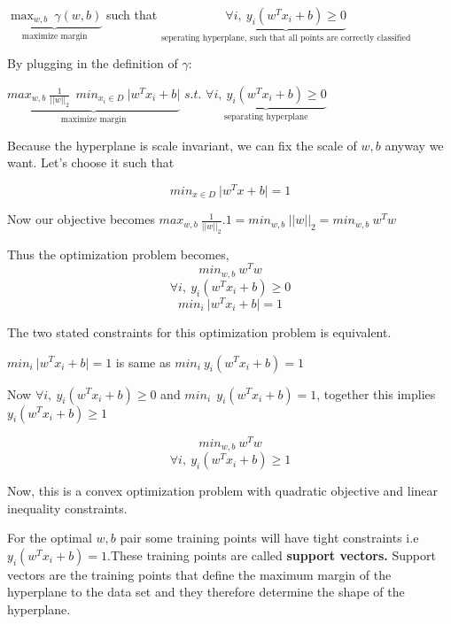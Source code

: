 \documentclass[12pt]{article}
\begin{document}
 $\underbrace{\max_{w,b}  \ \gamma(w,b)}_\text{maximize margin}$ such that $\underbrace{ \forall i, \ y_{i}(w^{T}x_{i} + b) \geq 0}_\text{seperating hyperplane, such that all points are correctly classified}$
 
 
 By plugging in the definition of $\gamma$:
 
 $ \underbrace{max_{w,b} \  \frac{1} {\vert \vert w \vert \vert_{2} } \ \ min _{x_{i} \in D} \  \vert w^{T}x_{i} + b \vert }_\text{maximize margin}$ $s.t.$  $\underbrace{\forall i, \  y_{i}(w^{T}x_{i} + b) \geq 0}_\text{separating hyperplane}$ 
 
 
 Because the hyperplane is scale invariant, we can fix the scale of $w,b$ anyway we want. Let's  choose it such that 
 
 $$min_{x\in D}  \ \vert w^{T}x+b \vert = 1$$
 
 Now our objective becomes $max_{w,b} \  \frac{1} {\vert \vert w \vert \vert_{2}} . 1 = min_{w,b} \ \vert \vert w \vert \vert_{2} = min_{w,b} \  w^{T}w$
 
Thus the optimization problem becomes,
$$min_{w,b} \  w^{T}w$$
$$\forall i, \ y_{i}(w^{T}x_{i} + b) \geq 0$$
$$ min_{i} \  \vert w^{T}x_{i} +b \vert = 1$$ 

The two stated constraints for this optimization problem is equivalent.

$ min_{i} \  \vert w^{T}x_{i} +b \vert = 1$ is same as $ min_{i} \  y_{i}(w^{T}x_{i} + b) = 1$

Now $\forall i, \ y_{i}(w^{T}x_{i} + b) \geq 0$ and $min_{i} \ \ y_{i}(w^{T}x_{i} + b) = 1$, together this implies $ y_{i}(w^{T}x_{i} + b) \geq 1$
 
 
 
 
 
 
 $$min_{w,b} \  w^{T}w$$
 $$\forall i, \ y_{i}(w^{T}x_{i} + b) \geq 1$$
 
 
 
 
 
 
 
 
 
 
 
 
 Now, this is a convex optimization problem with quadratic objective and linear inequality constraints.
 
 
 For the optimal $w,b$ pair some training points will have tight constraints i.e $y_{i}(w^{T}x_{i} + b) = 1$.These training points are called \textbf{support vectors.} Support vectors  are the training points that define the maximum margin of the hyperplane to the data set and they therefore determine the shape of the hyperplane. 
 
\end{document}
